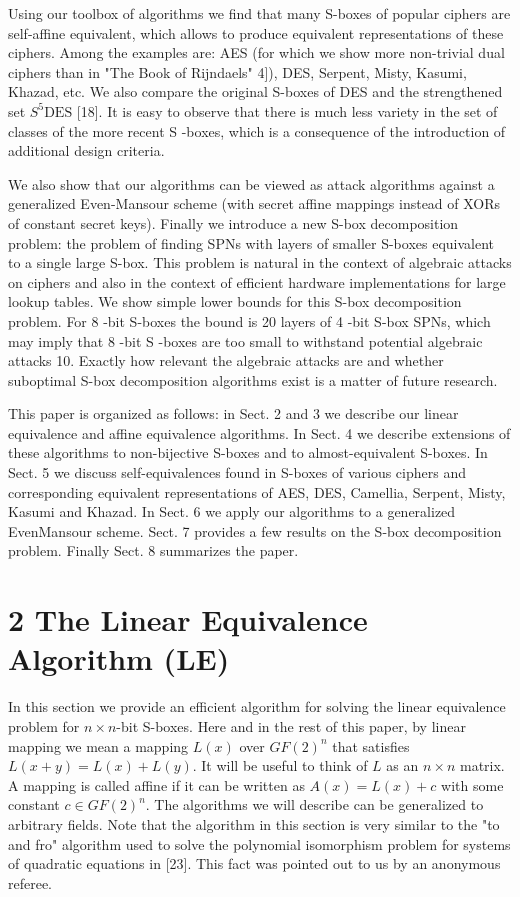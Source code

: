 \documentclass[10pt]{article}
\begin{document}
Using our toolbox of algorithms we find that many S-boxes of popular ciphers are self-affine equivalent, which allows to produce equivalent representations of these ciphers. Among the examples are: AES (for which we show more non-trivial dual ciphers than in "The Book of Rijndaels" 4]), DES, Serpent, Misty, Kasumi, Khazad, etc. We also compare the original S-boxes of DES and the strengthened set $S^{5} \mathrm{DES}$ [18]. It is easy to observe that there is much less variety in the set of classes of the more recent S -boxes, which is a consequence of the introduction of additional design criteria.

We also show that our algorithms can be viewed as attack algorithms against a generalized Even-Mansour scheme (with secret affine mappings instead of XORs of constant secret keys). Finally we introduce a new S-box decomposition problem: the problem of finding SPNs with layers of smaller S-boxes equivalent\\
to a single large S-box. This problem is natural in the context of algebraic attacks on ciphers and also in the context of efficient hardware implementations for large lookup tables. We show simple lower bounds for this S-box decomposition problem. For 8 -bit S-boxes the bound is 20 layers of 4 -bit S-box SPNs, which may imply that 8 -bit S -boxes are too small to withstand potential algebraic attacks 10. Exactly how relevant the algebraic attacks are and whether suboptimal S-box decomposition algorithms exist is a matter of future research.

This paper is organized as follows: in Sect. 2 and 3 we describe our linear equivalence and affine equivalence algorithms. In Sect. 4 we describe extensions of these algorithms to non-bijective S-boxes and to almost-equivalent S-boxes. In Sect. 5 we discuss self-equivalences found in S-boxes of various ciphers and corresponding equivalent representations of AES, DES, Camellia, Serpent, Misty, Kasumi and Khazad. In Sect. 6 we apply our algorithms to a generalized EvenMansour scheme. Sect. 7 provides a few results on the S-box decomposition problem. Finally Sect. 8 summarizes the paper.

\section*{2 The Linear Equivalence Algorithm (LE)}
In this section we provide an efficient algorithm for solving the linear equivalence problem for $n \times n$-bit S-boxes. Here and in the rest of this paper, by linear mapping we mean a mapping $L(x)$ over $G F(2)^{n}$ that satisfies $L(x+y)=L(x)+ L(y)$. It will be useful to think of $L$ as an $n \times n$ matrix. A mapping is called affine if it can be written as $A(x)=L(x)+c$ with some constant $c \in G F(2)^{n}$. The algorithms we will describe can be generalized to arbitrary fields. Note that the algorithm in this section is very similar to the "to and fro" algorithm used to solve the polynomial isomorphism problem for systems of quadratic equations in [23]. This fact was pointed out to us by an anonymous referee.
\end{document}
